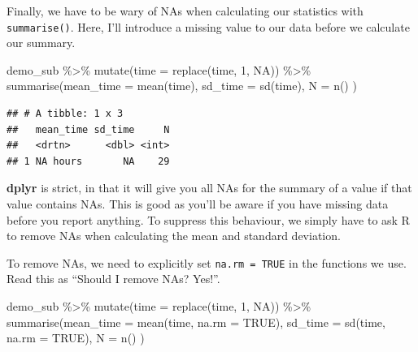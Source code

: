 \documentclass[
]{book}
\newenvironment{Shaded}{\begin{snugshade}}{\end{snugshade}}
\newcommand{\AttributeTok}[1]{\textcolor[rgb]{0.77,0.63,0.00}{#1}}
\newcommand{\ConstantTok}[1]{\textcolor[rgb]{0.00,0.00,0.00}{#1}}
\newcommand{\DecValTok}[1]{\textcolor[rgb]{0.00,0.00,0.81}{#1}}
\newcommand{\FunctionTok}[1]{\textcolor[rgb]{0.00,0.00,0.00}{#1}}
\newcommand{\NormalTok}[1]{#1}
\newcommand{\SpecialCharTok}[1]{\textcolor[rgb]{0.00,0.00,0.00}{#1}}
\begin{document}
Finally, we have to be wary of NAs when calculating our statistics with \texttt{summarise()}. Here, I'll introduce a missing value to our data before we calculate our summary.

\begin{Shaded}
\begin{Highlighting}[]
\NormalTok{demo\_sub }\SpecialCharTok{\%\textgreater{}\%} 
  \FunctionTok{mutate}\NormalTok{(}\AttributeTok{time =} \FunctionTok{replace}\NormalTok{(time, }\DecValTok{1}\NormalTok{, }\ConstantTok{NA}\NormalTok{)) }\SpecialCharTok{\%\textgreater{}\%}
  \FunctionTok{summarise}\NormalTok{(}\AttributeTok{mean\_time =} \FunctionTok{mean}\NormalTok{(time),}
           \AttributeTok{sd\_time =} \FunctionTok{sd}\NormalTok{(time),}
           \AttributeTok{N =} \FunctionTok{n}\NormalTok{()}
\NormalTok{           )}
\end{Highlighting}
\end{Shaded}

\begin{verbatim}
## # A tibble: 1 x 3
##   mean_time sd_time     N
##   <drtn>      <dbl> <int>
## 1 NA hours       NA    29
\end{verbatim}

\textbf{dplyr} is strict, in that it will give you all NAs for the summary of a value if that value contains NAs. This is good as you'll be aware if you have missing data before you report anything. To suppress this behaviour, we simply have to ask R to remove NAs when calculating the mean and standard deviation.

To remove NAs, we need to explicitly set \texttt{na.rm\ =\ TRUE} in the functions we use. Read this as ``Should I remove NAs? Yes!''.

\begin{Shaded}
\begin{Highlighting}[]
\NormalTok{demo\_sub }\SpecialCharTok{\%\textgreater{}\%} 
  \FunctionTok{mutate}\NormalTok{(}\AttributeTok{time =} \FunctionTok{replace}\NormalTok{(time, }\DecValTok{1}\NormalTok{, }\ConstantTok{NA}\NormalTok{)) }\SpecialCharTok{\%\textgreater{}\%}
  \FunctionTok{summarise}\NormalTok{(}\AttributeTok{mean\_time =} \FunctionTok{mean}\NormalTok{(time, }\AttributeTok{na.rm =} \ConstantTok{TRUE}\NormalTok{),}
           \AttributeTok{sd\_time =} \FunctionTok{sd}\NormalTok{(time, }\AttributeTok{na.rm =} \ConstantTok{TRUE}\NormalTok{),}
           \AttributeTok{N =} \FunctionTok{n}\NormalTok{()}
\NormalTok{           )}
\end{Highlighting}
\end{Shaded}
\end{document}
